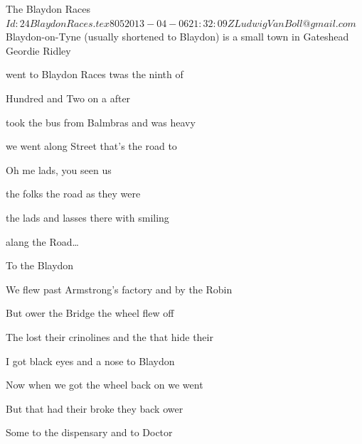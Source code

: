 \begin{SBSong}{The Blaydon Races}
  {$Id: 24BlaydonRaces.tex 805 2013-04-06 21:32:09Z LudwigVanBoll@gmail.com $}
  {Blaydon-on-Tyne (usually shortened to Blaydon) is a small town in Gateshead}
  {Geordie Ridley}
  \begin{SBVerse}
     went to Blaydon Races twas the ninth of 
    
     Hundred and  Two on a  after 
    
     took the bus from Balmbras and  was heavy 
    
     we went along  Street that's  the road to 
  \end{SBVerse}
  \begin{SBChorus}
    Oh me lads, you  seen us 
    
     the folks  the road  as they were 
    
     the lads and lasses there  with smiling 
    
     alang the  Road\ldots
    
    To  the Blaydon 
  \end{SBChorus}
  \begin{SBVerse}
    We flew past Armstrong's factory and  by the Robin 
    
    But  ower the  Bridge the  wheel flew off 
    
    The  lost their crinolines and the  that hide their 
    
    I got  black eyes and a  nose  to Blaydon 
  \end{SBVerse}
  \begin{SBVerse}
    Now when we got the wheel back on  we went 
    
    But  that had their  broke they  back ower 
    
    Some  to the dispensary and  to Doctor 
    

\end{SBVerse}
\end{SBSong}
